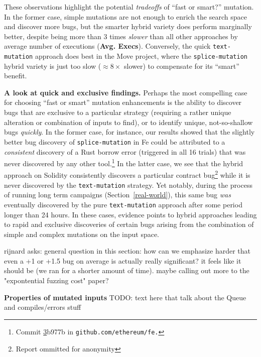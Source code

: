 These observations highlight the potential \emph{tradeoffs} of ``fast or
smart?'' mutation. In the former case, simple mutations are not enough to
enrich the search space and discover more bugs, but the smarter hybrid variety
does perform marginally better, despite being more than 3 times \emph{slower}
than all other approaches by average number of executions (\textbf{Avg.
Execs}). Conversely, the quick \texttt{text-mutation} approach does best in the
Move project, where the \texttt{splice-mutation} hybrid variety is just too
slow ($\approx8\times$ slower) to compensate for its ``smart'' benefit.

\textbf{A look at quick and exclusive findings.} Perhaps the most compelling
case for choosing ``fast or smart'' mutation enhancements is the ability to
discover bugs that are exclusive to a particular strategy (requiring a rather
unique alteration or combination of inputs to find), or to identify unique,
not-so-shallow bugs \emph{quickly}. In the former case, for instance, our results
showed that the slightly better bug discovery of \texttt{splice-mutation} in Fe
could be attributed to a \emph{consistent} discovery of a Rust borrow error
(triggered in all 16 trials) that was never discovered by any other
tool.\footnote{Commit
\href{https://github.com/ethereum/fe/commit/3b977b3078eb163ba521f57d8509e16efdb9dbf4}
3b977b in \texttt{github.com/ethereum/fe.}} In the latter case, we see that the
hybrid approach on Solidity consistently discovers a particular contract
bug\footnote{Report ommitted for anonymity} while it is never discovered by the
\texttt{text-mutation} strategy. Yet notably, during the process of running long
term campaigns (Section~\ref{real-world}), this same bug \emph{was} eventually discovered by the pure
\texttt{text-mutation} approach after some period longer than 24 hours. In
these cases, evidence points to hybrid approaches leading to rapid and
exclusive discoveries of certain bugs arising from 
the combination of simple and complex mutations on the input space.

{\color{red} rijnard asks: general question in this section: how can we emphasize harder that even a +1 or +1.5 bug on average is actually really significant? it feels like it should be (we ran for a shorter amount of time). maybe calling out more to the "expontential fuzzing cost" paper?}

\textbf{Properties of mutated inputs}
{\color{red} TODO: text here that talk about the Queue and compiles/errors stuff}
